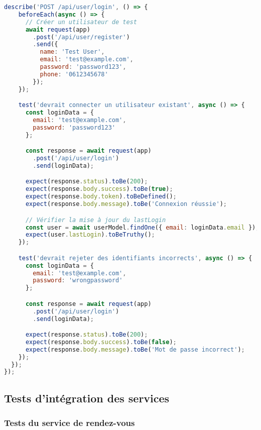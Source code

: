 \begin{lstlisting}[language=JavaScript, caption=authRoutes.integration.test.js]
  describe('POST /api/user/login', () => {
    beforeEach(async () => {
      // Créer un utilisateur de test
      await request(app)
        .post('/api/user/register')
        .send({
          name: 'Test User',
          email: 'test@example.com',
          password: 'password123',
          phone: '0612345678'
        });
    });

    test('devrait connecter un utilisateur existant', async () => {
      const loginData = {
        email: 'test@example.com',
        password: 'password123'
      };

      const response = await request(app)
        .post('/api/user/login')
        .send(loginData);

      expect(response.status).toBe(200);
      expect(response.body.success).toBe(true);
      expect(response.body.token).toBeDefined();
      expect(response.body.message).toBe('Connexion réussie');

      // Vérifier la mise à jour du lastLogin
      const user = await userModel.findOne({ email: loginData.email });
      expect(user.lastLogin).toBeTruthy();
    });

    test('devrait rejeter des identifiants incorrects', async () => {
      const loginData = {
        email: 'test@example.com',
        password: 'wrongpassword'
      };

      const response = await request(app)
        .post('/api/user/login')
        .send(loginData);

      expect(response.status).toBe(200);
      expect(response.body.success).toBe(false);
      expect(response.body.message).toBe('Mot de passe incorrect');
    });
  });
});
\end{lstlisting}

\subsection{Tests d'intégration des services}

\subsubsection{Tests du service de rendez-vous}

